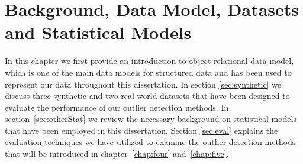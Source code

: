 
%
%

\chapter{Background, Data Model, Datasets and Statistical Models}
\label{chap:three}

In this chapter we first provide an introduction to object-relational data model, which is one of the main data models for structured data and has been used to represent our data throughout this dissertation. 
In section \ref{sec:synthetic} we discuss three synthetic and two real-world datasets that have been designed to evaluate the performance of our outlier detection methods. In section~\ref{sec:otherStat} we review the necessary background on statistical models that have been employed in this dissertation.  Section \ref{sec:eval} explains the evaluation techniques we have utilized to examine the outlier detection methods that will be introduced in chapter~\ref{chap:four} and~\ref{chap:five}.


 
